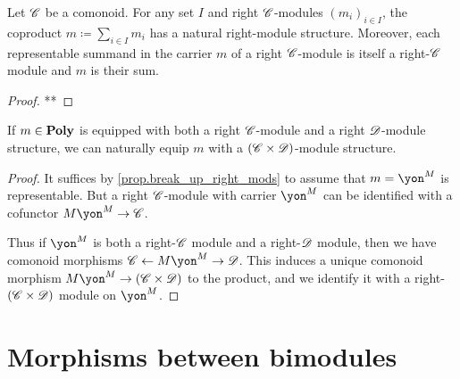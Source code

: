 \documentclass[Book-Poly]{subfiles}
\begin{document}
\begin{proposition}\label{prop.break_up_right_mods}
Let $\mathscr{C}$ be a comonoid. For any set $I$ and right $\mathscr{C}$-modules $(m_i)_{i\in I}$, the coproduct $m\coloneqq \sum_{i\in I}m_i$ has a natural right-module structure. Moreover, each representable summand in the carrier $m$ of a right $\mathscr{C}$-module is itself a right-$\mathscr{C}$ module and $m$ is their sum.
\end{proposition}
\begin{proof}
**
\end{proof}
%
%
%

\begin{proposition}
If $m\in\mathbf{Poly}$ is equipped with both a right $\mathscr{C}$-module and a right $\mathscr{D}$-module structure, we can naturally equip $m$ with a $(\mathscr{C}\times\mathscr{D})$-module structure.
\end{proposition}
\begin{proof}
It suffices by \cref{prop.break_up_right_mods} to assume that $m=\yon^M$ is representable. But a right $\mathscr{C}$-module with carrier $\yon^M$ can be identified with a cofunctor $M\yon^M\to\com{C}$.

Thus if $\yon^M$ is both a right-$\mathscr{C}$ module and a right-$\mathscr{D}$ module, then we have comonoid morphisms $\com{C}\from M\yon^M\to\com{D}$. This induces a unique comonoid morphism $M\yon^M\to(\com{C}\times\com{D})$ to the product, and we identify it with a right-$(\mathscr{C}\times\mathscr{D})$ module on $\yon^M$.
\end{proof}

\section{Morphisms between bimodules}
\end{document}
